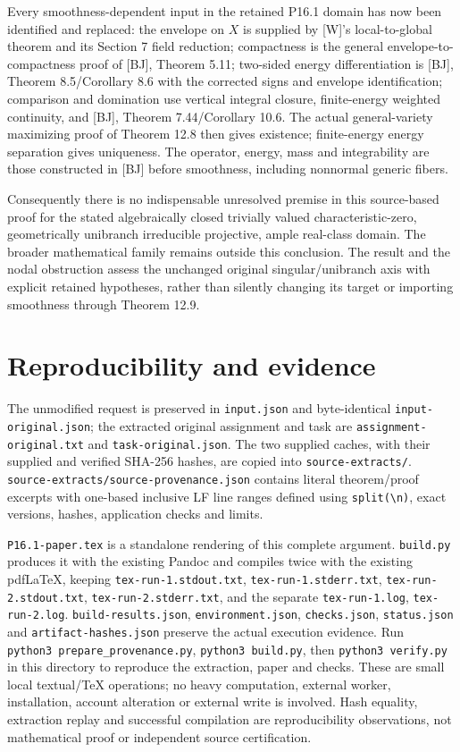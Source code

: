 \documentclass[11pt]{article}
\begin{document}
Every smoothness-dependent input in the retained P16.1 domain has now
been identified and replaced: the envelope on \(X\) is supplied by
{[}W{]}'s local-to-global theorem and its Section 7 field reduction;
compactness is the general envelope-to-compactness proof of {[}BJ{]},
Theorem 5.11; two-sided energy differentiation is {[}BJ{]}, Theorem
8.5/Corollary 8.6 with the corrected signs and envelope identification;
comparison and domination use vertical integral closure, finite-energy
weighted continuity, and {[}BJ{]}, Theorem 7.44/Corollary 10.6. The
actual general-variety maximizing proof of Theorem 12.8 then gives
existence; finite-energy energy separation gives uniqueness. The
operator, energy, mass and integrability are those constructed in
{[}BJ{]} before smoothness, including nonnormal generic fibers.

Consequently there is no indispensable unresolved premise in this
source-based proof for the stated algebraically closed trivially valued
characteristic-zero, geometrically unibranch irreducible projective,
ample real-class domain. The broader mathematical family remains outside
this conclusion. The result and the nodal obstruction assess the
unchanged original singular/unibranch axis with explicit retained
hypotheses, rather than silently changing its target or importing
smoothness through Theorem 12.9.

\section{Reproducibility and
evidence}\label{reproducibility-and-evidence}

The unmodified request is preserved in \texttt{input.json} and
byte-identical \texttt{input-original.json}; the extracted original
assignment and task are \texttt{assignment-original.txt} and
\texttt{task-original.json}. The two supplied caches, with their
supplied and verified SHA-256 hashes, are copied into
\texttt{source-extracts/}.
\texttt{source-extracts/source-provenance.json} contains literal
theorem/proof excerpts with one-based inclusive LF line ranges defined
using
\texttt{split(\textquotesingle{}\textbackslash{}n\textquotesingle{})},
exact versions, hashes, application checks and limits.

\texttt{P16.1-paper.tex} is a standalone rendering of this complete
argument. \texttt{build.py} produces it with the existing Pandoc and
compiles twice with the existing pdfLaTeX, keeping
\texttt{tex-run-1.stdout.txt}, \texttt{tex-run-1.stderr.txt},
\texttt{tex-run-2.stdout.txt}, \texttt{tex-run-2.stderr.txt}, and the
separate \texttt{tex-run-1.log}, \texttt{tex-run-2.log}.
\texttt{build-results.json}, \texttt{environment.json},
\texttt{checks.json}, \texttt{status.json} and
\texttt{artifact-hashes.json} preserve the actual execution evidence.
Run \texttt{python3\ prepare\_provenance.py},
\texttt{python3\ build.py}, then \texttt{python3\ verify.py} in this
directory to reproduce the extraction, paper and checks. These are small
local textual/TeX operations; no heavy computation, external worker,
installation, account alteration or external write is involved. Hash
equality, extraction replay and successful compilation are
reproducibility observations, not mathematical proof or independent
source certification.
\end{document}
